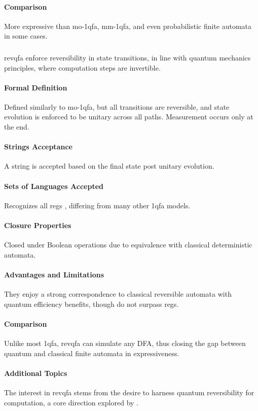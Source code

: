 \paragraph{Comparison}
More expressive than \gls{mo-1qfa}, \gls{mm-1qfa}, and even probabilistic finite automata in some cases.

\subsubsection{}
\gls{revqfa} enforce reversibility in state transitions, in line with quantum mechanics principles, where computation steps are invertible.

\paragraph{Formal Definition}
Defined similarly to \gls{mo-1qfa}, but all transitions are reversible, and state evolution is enforced to be unitary across all paths. Measurement occurs only at the end.

\paragraph{Strings Acceptance}
A string is accepted based on the final state post unitary evolution.

\paragraph{Sets of Languages Accepted}
Recognizes all \glspl{reg} \cite{yamakami2014one}, differing from many other \gls{1qfa} models.

\paragraph{Closure Properties}
Closed under Boolean operations due to equivalence with classical deterministic automata.

\paragraph{Advantages and Limitations}
They enjoy a strong correspondence to classical reversible automata with quantum efficiency benefits, though do not surpass \glspl{reg}.

\paragraph{Comparison}
Unlike most \gls{1qfa}, \gls{revqfa} can simulate any DFA, thus closing the gap between quantum and classical finite automata in expressiveness.

\paragraph{Additional Topics}
The interest in \gls{revqfa} stems from the desire to harness quantum reversibility for computation, a core direction explored by \cite{ciamarra2001quantum}.
